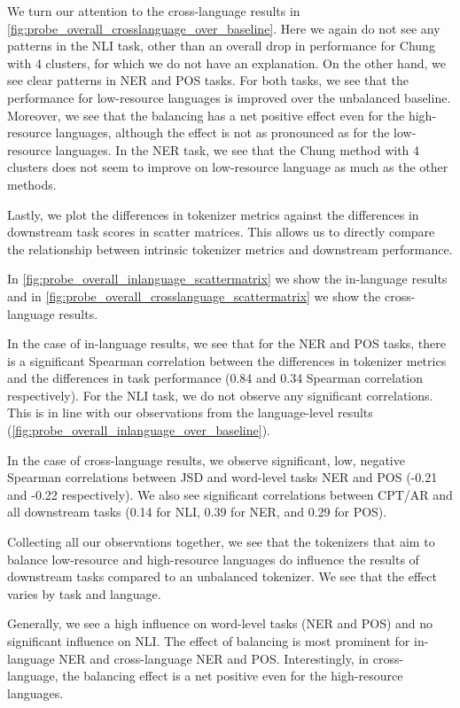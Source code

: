 We turn our attention to the cross-language results in \autoref{fig:probe_overall_crosslanguage_over_baseline}. Here we again do not see any patterns in the NLI task, other than an overall drop in performance for Chung with 4 clusters, for which we do not have an explanation. On the other hand, we see clear patterns in NER and POS tasks. For both tasks, we see that the performance for low-resource languages is improved over the unbalanced baseline. Moreover, we see that the balancing has a net positive effect even for the high-resource languages, although the effect is not as pronounced as for the low-resource languages. In the NER task, we see that the Chung method with 4 clusters does not seem to improve on low-resource language as much as the other methods. 

Lastly, we plot the differences in tokenizer metrics against the differences in downstream task scores in scatter matrices. This allows us to directly compare the relationship between intrinsic tokenizer metrics and downstream performance.

In \autoref{fig:probe_overall_inlanguage_scattermatrix} we show the in-language results and in \autoref{fig:probe_overall_crosslanguage_scattermatrix} we show the cross-language results. 

In the case of in-language results, we see that for the NER and POS tasks, there is a significant Spearman correlation between the differences in tokenizer metrics and the differences in task performance (0.84 and 0.34 Spearman correlation respectively). For the NLI task, we do not observe any significant correlations. This is in line with our observations from the language-level results (\autoref{fig:probe_overall_inlanguage_over_baseline}). 

In the case of cross-language results, we observe significant, low, negative Spearman correlations between JSD and word-level tasks NER and POS (-0.21 and -0.22 respectively). We also see significant correlations between CPT/AR and all downstream tasks (0.14 for NLI, 0.39 for NER, and 0.29 for POS).

Collecting all our observations together, we see that the tokenizers that aim to balance low-resource and high-resource languages do influence the results of downstream tasks compared to an unbalanced tokenizer. We see that the effect varies by task and language. 

Generally, we see a high influence on word-level tasks (NER and POS) and no significant influence on NLI. The effect of balancing is most prominent for in-language NER and cross-language NER and POS. Interestingly, in cross-language, the balancing effect is a net positive even for the high-resource languages.


